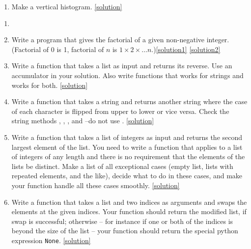 \documentclass[a4paper]{article}
\begin{document}
{\begin{uexercise}
\begin{enumerate}
\begin{Verbatim}
a *****
b **
c *
d *
r **
\end{Verbatim}
\href{https://github.com/umutozge/prog-book/blob/master/code/char_histo.py}{[solution]}

\item Make a vertical histogram.
\href{https://github.com/umutozge/prog-book/blob/master/code/char_histo_vert.py}{[solution]}
\end{enumerate}
\end{uexercise}

\begin{uexercise}
\begin{enumerate}
\item[]
\item
Write a program  that gives the factorial of a given non-negative integer.
(Factorial of 0 is 1, factorial of $n$ is $1\times 2 \times\ldots
n$.)\href{https://github.com/umutozge/prog-book/blob/master/code/fact-iter-for.py}{[solution1]}
 \href{https://github.com/umutozge/prog-book/blob/master/code/fact-iter-while.py}{[solution2]}

\item
Write a function that takes a list as input and returns its reverse. Use
an accumulator in your solution. Also write functions that works for strings and
works for both.  \href{https://github.com/umutozge/prog-book/blob/master/code/reverse.py}{[solution]}

\item Write a function  that takes a string and returns another
string where the case of each character is flipped from upper to lower or vice
versa. Check the string methods , , ,
and --do not use .
\href{https://github.com/umutozge/prog-book/blob/master/code/flip.py}{[solution]}

\item Write a  function  that takes a list of integers
as input and returns the second largest element of the list. You need to write a
function that applies to a list of integers of any length and there is no
requirement that the elements of the lists be distinct. Make a list of all
exceptional cases (empty list, lists with repeated elements, and the like),
decide what to do in these cases, and make your function handle all these cases
smoothly. \href{https://github.com/umutozge/prog-book/blob/master/code/seclarge.py}{[solution]}

\item
Write a function  that takes a list and two indices as arguments
and swaps the elements at the given indices. Your function should return the
modified list, if swap is successful; otherwise -- for instance if one or both
of the indices is beyond the size of the list -- your function should return the
special python expression \Verb+None+.
\href{https://github.com/umutozge/prog-book/blob/master/code/swap.py}{[solution]}



\end{enumerate}
\end{uexercise}}
\end{document}
